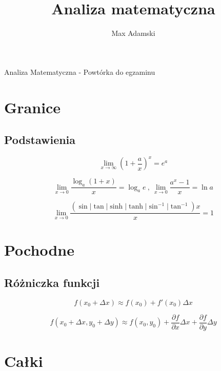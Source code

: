 \documentclass[11pt]{article}
\title{Analiza matematyczna}
\author{Max Adamski}
\date{}
\begin{document}
\begin{center}
	\LARGE Analiza Matematyczna - Powtórka do egzaminu \\
\end{center}

\vspace{0.4cm}

\section{Granice}

\subsection{Podstawienia}
\begin{equation}
	\lim_{x \to \infty} \left(1 + \frac{a}{x}\right)^x = e^a
\end{equation}

\begin{equation}
	\lim_{x \to 0} \frac{\log_a (1 + x)}{x} = \log_a e\ ,\ 
	\lim_{x \to 0} \frac{a^x - 1}{x} = \ln a
\end{equation}

\begin{equation}
	\lim_{x \to 0} \frac{(\sin | \tan | \sinh | \tanh | \sin^{-1} | \tan^{-1}) x}{x} = 1
\end{equation}

\section{Pochodne}

\subsection{Różniczka funkcji}

\begin{equation}
	f(x_0 + \Delta x) \approx f(x_0) + f'(x_0) \Delta x
\end{equation}

\begin{equation}
	f(x_0 + \Delta x, y_0 + \Delta y) \approx f(x_0, y_0) + 
	\frac{\partial f}{\partial x} \Delta x + 
	\frac{\partial f}{\partial y} \Delta y
\end{equation}

\section{Całki}
\end{document}
